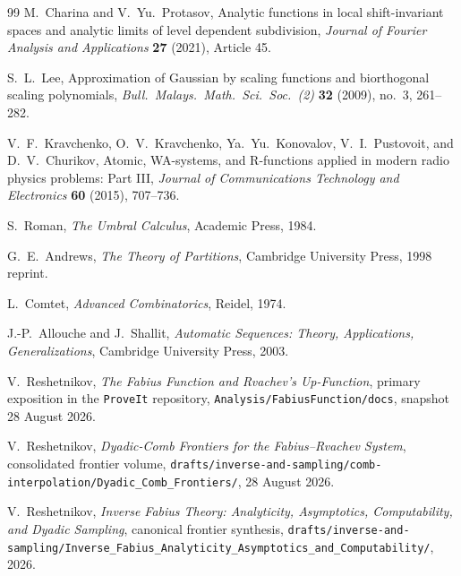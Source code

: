 \documentclass[11pt,oneside]{article}
\numberwithin{equation}{section}
\theoremstyle{definition}
\theoremstyle{remark}
\newcommand{\repo}{\nolinkurl{Analysis/FabiusFunction/docs}}
\begin{document}
\begin{thebibliography}{99}
M.~Charina and V.~Yu.~Protasov,
\newblock Analytic functions in local shift-invariant spaces and
analytic limits of level dependent subdivision,
\newblock \emph{Journal of Fourier Analysis and Applications}
\textbf{27} (2021), Article 45.

S.~L.~Lee,
\newblock Approximation of Gaussian by scaling functions and
biorthogonal scaling polynomials,
\newblock \emph{Bull.\ Malays.\ Math.\ Sci.\ Soc.\ (2)} \textbf{32}
(2009), no.~3, 261--282.

V.~F.~Kravchenko, O.~V.~Kravchenko, Ya.~Yu.~Konovalov,
V.~I.~Pustovoit, and D.~V.~Churikov,
\newblock Atomic, WA-systems, and R-functions applied in modern radio
physics problems: Part III,
\newblock \emph{Journal of Communications Technology and Electronics}
\textbf{60} (2015), 707--736.

S.~Roman,
\newblock \emph{The Umbral Calculus},
\newblock Academic Press, 1984.

G.~E.~Andrews,
\newblock \emph{The Theory of Partitions},
\newblock Cambridge University Press, 1998 reprint.

L.~Comtet,
\newblock \emph{Advanced Combinatorics},
\newblock Reidel, 1974.

J.-P.~Allouche and J.~Shallit,
\newblock \emph{Automatic Sequences: Theory, Applications,
Generalizations},
\newblock Cambridge University Press, 2003.

V.~Reshetnikov,
\newblock \emph{The Fabius Function and Rvachev's Up-Function},
\newblock primary exposition in the \texttt{ProveIt} repository,
\repo, snapshot 28 August 2026.

V.~Reshetnikov,
\newblock \emph{Dyadic-Comb Frontiers for the Fabius--Rvachev
System},
\newblock consolidated frontier volume,
\nolinkurl{drafts/inverse-and-sampling/comb-interpolation/Dyadic_Comb_Frontiers/},
28 August 2026.

V.~Reshetnikov,
\newblock \emph{Inverse Fabius Theory: Analyticity, Asymptotics,
Computability, and Dyadic Sampling},
\newblock canonical frontier synthesis,
\nolinkurl{drafts/inverse-and-sampling/Inverse_Fabius_Analyticity_Asymptotics_and_Computability/},
2026.

\end{thebibliography}
\end{document}
